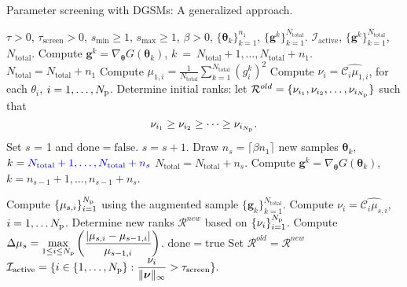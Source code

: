 \bigskip
\begin{breakablealgorithm}
\renewcommand{\algorithmicrequire}{\textbf{Input:}}
\renewcommand{\algorithmicensure}{\textbf{Output:}}
  \caption{Parameter screening with DGSMs: A generalized approach.}
  \begin{algorithmic}[1]
\Require $\tau > 0$, $\tau_\text{screen} > 0$, $s_\text{min} \geq 1$,
$s_\text{max} \geq 1$, $\beta > 0$, $\{ \bm{\theta}_k \}_{k = 1}^{n_1}$, $\{ \bm{g}^k \}_{k=1}^{N_\text{total}}$. 
\Ensure $\mathcal{I}_\text{active}$, $\{ \bm{g}^k \}_{k=1}^{N_\text{total}}$, $N_\text{total}$. 
      \State Compute $\bm{g}^k = \nabla_{\bm{\theta}}G(\bm\theta_k)$, 
             $k~=~N_\text{total}+1, \ldots, N_\text{total}+n_1$. 
      \State $N_\text{total} = N_\text{total} + n_1$
      \State Compute 
      $\mu_{1, i} = \frac{1}{N_\text{total}} \sum_{k = 1}^{N_\text{total}} (g^k_i)^2$
      \State Compute $\nu_i = \widehat{\mathcal{C}_i\mu_{1,i}}$, for each $\theta_i$, 
             $i = 1, \ldots, {N_\text{p}}$. 
      \State Determine initial ranks: 
            let $\mathcal{R}^{old} = \{ \nu_{i_1}, \nu_{i_2}, \ldots, \nu_{i_{N_\text{p}}}\}$ such that 
\[
   \nu_{i_1} \geq \nu_{i_2} \geq \cdots \geq \nu_{i_{N_\text{p}}}. 
\]
      \State Set $s$ = 1 and $\mathrm{done} = \mathrm{false}$.
        \State $s = s + 1$.
        \State Draw $n_s = \lceil \beta n_1 \rceil$ new samples 
                  $\bm{\theta}_k$, $k = {\color{blue}{N_\text{total} + 1, \ldots, N_\text{total} + n_s}}$
       \State $N_\text{total} = N_\text{total} + n_s$.
        \State Compute $\bm{g}^k = \nabla_{\bm{\theta}}G(\bm\theta_k)$,
             $k = n_{s-1}+1, \ldots, n_{s-1}+n_s$.

        \State Compute $\{ \mu_{s,i} \}_{i=1}^{N_\text{p}}$ using the augmented sample 
               $\{\bm{g}_k \}_{k = 1}^{N_\text{total}}$.
        \State Compute $\nu_i = \widehat{\mathcal{C}_i\mu_{s,i}}$, $i = 1, \ldots {N_\text{p}}$.
        \State Determine new ranks $\mathcal{R}^{new}$ based on $\{\nu_i\}_{i=1}^{N_\text{p}}$. 
        \State Compute $\displaystyle\Delta\mu_s = \max_{1\leq i \leq {N_\text{p}}}
               \left(\frac{|\mu_{s,i} - \mu_{s-1,i}|}{ \mu_{s-1,i}}\right)$.
         \State $\mathrm{done} = \mathrm{true}$
      \Else
          \State Set $\mathcal{R}^{old} = \mathcal{R}^{new}$
      \EndIf
    \EndWhile
    \State $\mathcal{I}_\text{active} = \{ i \in \{1, \ldots, {N_\text{p}}\} : \displaystyle\frac{\nu_i}
        {\|\bm{\nu}\|_\infty} > \tau_\text{screen}\}.$
    
    \EndProcedure
  \end{algorithmic}
  \label{alg:screen}
\end{breakablealgorithm}
\bigskip

